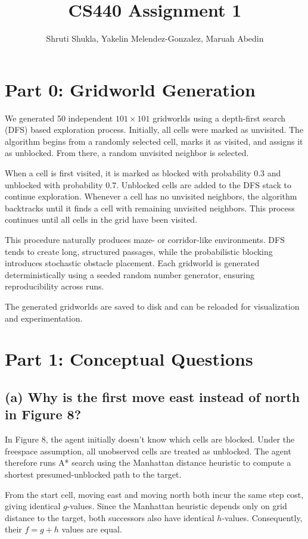 \documentclass{article}
\title{CS440 Assignment 1}
\author{Shruti Shukla, Yakelin Melendez-Gonzalez, Maruah Abedin}
\begin{document}
\maketitle

\section{Part 0: Gridworld Generation}

We generated 50 independent $101 \times 101$ gridworlds using a depth-first search (DFS) based exploration process. Initially, all cells were marked as unvisited. The algorithm begins from a randomly selected cell, marks it as visited, and assigns it as unblocked. From there, a random unvisited neighbor is selected.

When a cell is first visited, it is marked as blocked with probability $0.3$ and unblocked with probability $0.7$. Unblocked cells are added to the DFS stack to continue exploration. Whenever a cell has no unvisited neighbors, the algorithm backtracks until it finds a cell with remaining unvisited neighbors. This process continues until all cells in the grid have been visited.

This procedure naturally produces maze- or corridor-like environments. DFS tends to create long, structured passages, while the probabilistic blocking introduces stochastic obstacle placement. Each gridworld is generated deterministically using a seeded random number generator, ensuring reproducibility across runs.

The generated gridworlds are saved to disk and can be reloaded for visualization and experimentation.

\section{Part 1: Conceptual Questions}

\subsection{(a) Why is the first move east instead of north in Figure 8?}

In Figure 8, the agent initially doesn't know which cells are blocked. Under the freespace assumption, all unobserved cells are treated as unblocked. The agent therefore runs A* search using the Manhattan distance heuristic to compute a shortest presumed-unblocked path to the target.

From the start cell, moving east and moving north both incur the same step cost, giving identical $g$-values. Since the Manhattan heuristic depends only on grid distance to the target, both successors also have identical $h$-values. Consequently, their $f = g + h$ values are equal.
\end{document}
